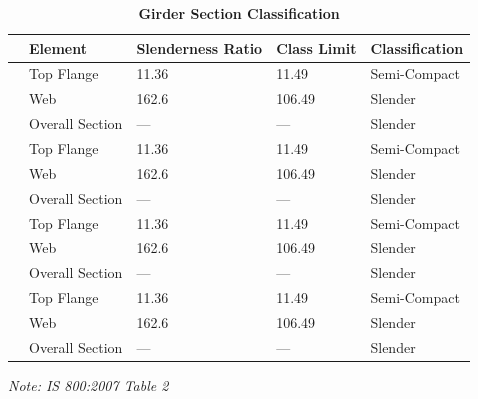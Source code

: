 \documentclass[12pt,a4paper]{report}
\numberwithin{table}{chapter}
\numberwithin{figure}{chapter}
\begin{document}
\vspace{1em}
\begin{longtable}{|C{2.5cm}|L{3cm}|C{3.5cm}|C{2.5cm}|>{\centering\arraybackslash}p{4.0cm}|}
\caption{\textbf{Girder Section Classification}}\\
\hline
\textbf{} & \textbf{Element} & \textbf{Slenderness Ratio} & \textbf{Class Limit} & \textbf{Classification} \\[6pt]
\hline
{} & Top Flange & 11.36 & 11.49 & Semi-Compact \\[6pt]
 & Web & 162.6 & 106.49 & Slender \\[6pt]
 & Overall Section & --- & --- & Slender \\[6pt]
\hline
{} & Top Flange & 11.36 & 11.49 & Semi-Compact \\[6pt]
 & Web & 162.6 & 106.49 & Slender \\[6pt]
 & Overall Section & --- & --- & Slender \\[6pt]
\hline
{} & Top Flange & 11.36 & 11.49 & Semi-Compact \\[6pt]
 & Web & 162.6 & 106.49 & Slender \\[6pt]
 & Overall Section & --- & --- & Slender \\[6pt]
\hline
{} & Top Flange & 11.36 & 11.49 & Semi-Compact \\[6pt]
 & Web & 162.6 & 106.49 & Slender \\[6pt]
 & Overall Section & --- & --- & Slender \\[6pt]
\hline
\end{longtable}
\noindent\textit{Note: IS 800:2007 Table 2}
\end{document}
